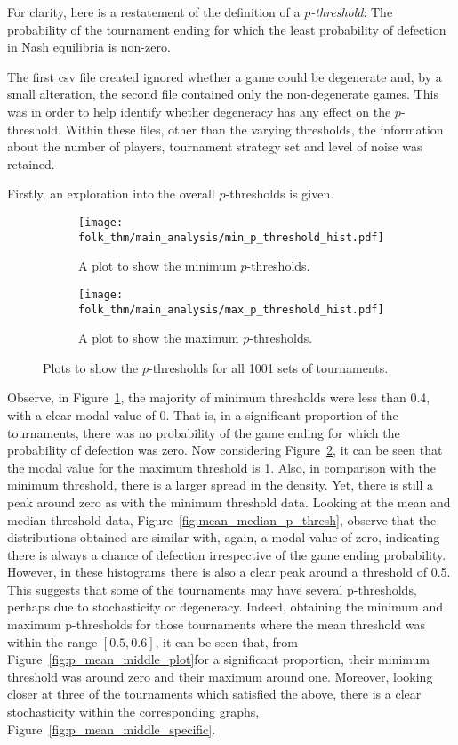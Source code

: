 For clarity, here is a restatement of the definition of a
\textit{\(p\)-threshold}: The probability of the tournament ending for which the
least probability of defection in Nash equilibria is non-zero.

The first csv file created ignored whether a game could be degenerate and, by a
small alteration, the second file contained only the non-degenerate games. This
was in order to help identify whether degeneracy has any effect on the
\(p\)-threshold. Within these files, other than the varying thresholds, the
information about the number of players, tournament strategy set and level of
noise was retained.

Firstly, an exploration into the overall \(p\)-thresholds is given.

\begin{figure}
    \begin{subfigure}{.45\textwidth}
        \centering
        \texttt{[image: folk\_thm/main\_analysis/min\_p\_threshold\_hist.pdf]}
        \caption{A plot to show the minimum \(p\)-thresholds.}\label{subfig:min_p_thresh}
    \end{subfigure}
    \begin{subfigure}{.45\textwidth}
        \centering
        \texttt{[image: folk\_thm/main\_analysis/max\_p\_threshold\_hist.pdf]}
        \caption{A plot to show the maximum \(p\)-thresholds.}\label{subfig:max_p_thresh}
    \end{subfigure}
    \caption{Plots to show the \(p\)-thresholds for all 1001 sets of tournaments.}\label{fig:min_max_p_thresh}
\end{figure}

Observe, in Figure~\ref{subfig:min_p_thresh}, the majority of minimum thresholds
were less than 0.4, with a clear modal value of 0. That is, in a significant
proportion of the tournaments, there was no probability of the game ending for
which the probability of defection was zero. Now considering
Figure~\ref{subfig:max_p_thresh}, it can be seen that the modal value for the
maximum threshold is 1.
Also, in comparison with the minimum threshold, there is a larger spread in the
density. Yet, there is still a peak around zero as with the minimum threshold
data. Looking at the mean and median threshold data,
Figure~\ref{fig:mean_median_p_thresh}, observe that the distributions obtained
are similar with, again, a modal value of zero, indicating there is always a
chance of defection irrespective of the game ending probability. However, in
these histograms there is also a clear peak around a threshold of 0.5. This
suggests that some of the tournaments may have several p-thresholds, perhaps due
to stochasticity or degeneracy. Indeed, obtaining the minimum and maximum
p-thresholds for those tournaments where the mean threshold was within the range
\([0.5, 0.6]\), it can be seen that, from Figure~\ref{fig:p_mean_middle_plot}for a significant proportion, their minimum
threshold was around zero and their maximum around one. Moreover, looking closer
at three of the tournaments which satisfied the above, there is a clear
stochasticity within the corresponding graphs, Figure~\ref{fig:p_mean_middle_specific}.

